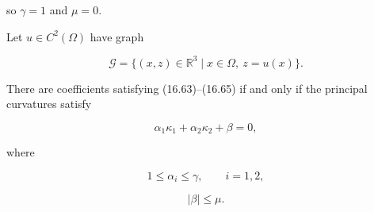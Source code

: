so $\gamma=1$ and $\mu=0$.

\begin{proposition}
\label{gilbarg-trudinger.prop.16.mean-curvature-type-characterization}
Let $u\in C^2(\Omega)$ have graph

\[
\mathcal{G}=\{(x,z)\in\mathbb{R}^3\mid x\in\Omega,\ z=u(x)\}.
\]

There are coefficients satisfying (16.63)--(16.65) if and only if the
principal curvatures satisfy

\begin{equation}\tag{16.63'}
\alpha_1\kappa_1+\alpha_2\kappa_2+\beta=0,
\end{equation}

where

\begin{equation}\tag{16.64'}
1\le \alpha_i\le \gamma,\qquad i=1,2,
\end{equation}

\begin{equation}\tag{16.65'}
|\beta|\le \mu.
\end{equation}
\end{proposition}
